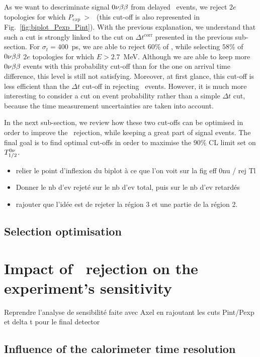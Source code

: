 As we want to descriminate signal $0\nu\beta\beta$ from delayed \Tl\ events, we reject $2e$ topologies for which $P_{exp}~>~$\Pint\ (this cut-off is also represented in Fig.~\ref{fig:biplot_Pexp_Pint}).
With the previous explanation, we understand that such a cut is strongly linked to the cut on $\Delta t^{\text{corr}}$ presented in the previous sub-section.
For $\sigma_{t}=400$~ps, we are able to reject $60$\% of \Tl, while selecting $58$\% of $0\nu\beta\beta$ $2e$ topologies for which $E>2.7$~MeV.
Although we are able to keep more $0\nu\beta\beta$ events with this probability cut-off than for the one on arrival time difference, this level is still not satisfying.
Moreover, at first glance, this cut-off is less efficient than the $\Delta t$ cut-off in rejecting \Tl\ events.
However, it is much more interesting to consider a cut on event probability rather than a simple $\Delta t$ cut, because the time measurement uncertainties are taken into account.

In the next sub-section, we review how these two cut-offs can be optimised in order to improve the \Tl\ rejection, while keeping a great part of signal events.
The final goal is to find optimal cut-offs in order to maximise the $90$\% CL limit set on $T_{1/2}^{0\nu}$.

\begin{itemize}
\item relier le point d'inflexion du biplot à ce que l'on voit sur la fig eff 0nu / rej Tl
\item Donner le nb d'ev rejeté sur le nb d'ev total, puis sur le nb d'ev retardés
\item rajouter que l'idée est de rejeter la région 3 et une partie de la région 2.
\end{itemize}

\subsection{Selection optimisation}
\label{subsec:selection_optimisation}


\section{Impact of \Tl\ rejection on the experiment's sensitivity}
Reprendre l'analyse de sensibilité faite avec Axel en rajoutant les cuts Pint/Pexp et delta t pour le final detector

\subsection{Influence of the calorimeter time resolution}

